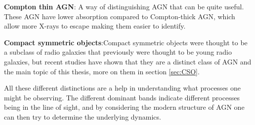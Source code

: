 \textbf{Compton thin AGN}: 
A way of distinguishing AGN that can be quite useful. These AGN have lower absorption compared to Compton-thick AGN, which allow more X-rays to escape making them easier to identify. 

\textbf{Compact symmetric objects}:Compact symmetric objects were thought to be a subclass of radio galaxies that previously were thought to be young radio galaxies, but recent studies have shown that they are a distinct class of AGN and the main topic of this thesis, more on them in section \ref{sec:CSO}.



All these different distinctions are a help in understanding what processes one might be observing. The different
dominant bands indicate different processes being in the line of sight, and by considering the modern structure of 
AGN one can then try to determine the underlying dynamics.  
